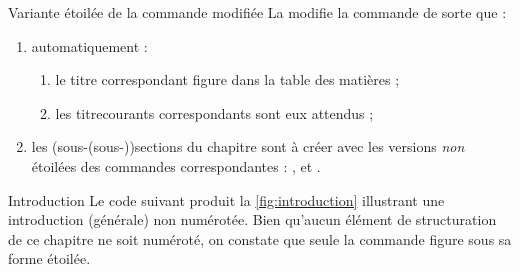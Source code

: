 
\begin{dbremark}{Variante étoilée de la commande \protect{} modifiée}{}
  La \yatcl{} modifie la commande  de sorte que :
  \begin{enumerate}
  \item automatiquement :
    \begin{enumerate}
    \item le titre correspondant figure dans la table des matières ;
    \item les \glspl{titrecourant} correspondants sont eux attendus ;
    \end{enumerate}
  \item les (sous-(sous-))sections du chapitre sont à créer avec les versions
    \emph{non} étoilées des commandes correspondantes : ,
     et .
  \end{enumerate}
\end{dbremark}

\begin{dbexample}{Introduction}{}
  Le code suivant produit la \vref{fig:introduction} illustrant une
  introduction (générale) non numérotée. Bien qu'aucun élément de structuration
  de ce chapitre ne soit numéroté, on constate que seule la commande
   figure sous sa forme étoilée.
\end{dbexample}

